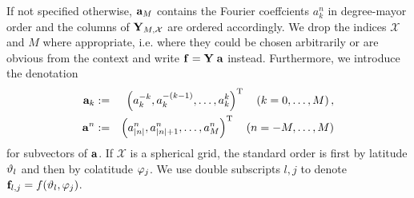 If not specified otherwise, $\mathbf{a}_{M}$ contains the Fourier coeffcients $a_{k}^n$ in degree-mayor order and the columns of $\mathbf{Y}_{M,\mathcal{X}}$ 
are ordered accordingly. We drop the indices $\mathcal{X}$ and $M$ where appropriate, i.e. where they could be chosen arbitrarily or are obvious from the 
context and write $\mathbf{f} = \mathbf{Y} \; \mathbf{a}$ instead. Furthermore, we introduce the denotation
\begin{eqnarray*}
 \mathbf{a}_{k} & := & \left(a_{k}^{-k},a_{k}^{-(k-1)},\ldots,a_{k}^k\right)^{\text{\rm{T}}} \quad \left(k=0,\ldots,M\right),\\
 \mathbf{a}^{n} & := & \left(a_{\left\vert n\right\vert}^{n},a_{\left\vert n\right\vert+1}^{n},\ldots,a_{M}^n\right)^{\text{\rm{T}}} \quad \left(n=-M,\ldots,M\right)
\end{eqnarray*} 
for subvectors of $\mathbf{a}$. If $\mathcal{X}$ is a spherical grid, the standard order is first by latitude $\vartheta_{l}$ and then by colatitude $\varphi_{j}$. 
We use double subscripts $l,j$ to denote $\mathbf{f}_{l,j} = f{\hspace{-0.4ex}}\left(\vartheta_{l},\varphi_{j}\right)$.

